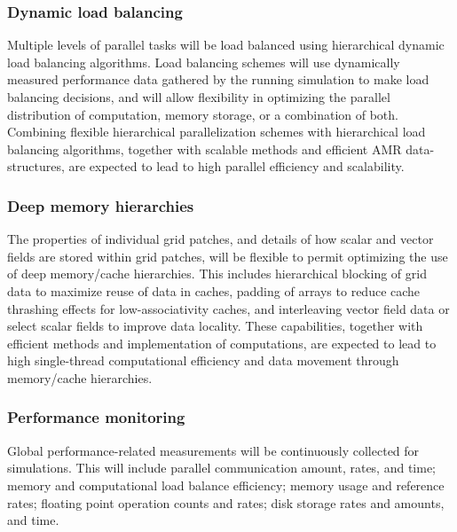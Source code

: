\documentclass{article}
\begin{document}

    \subsubsection{Dynamic load balancing}  

    Multiple levels of parallel tasks will be load balanced using
    hierarchical dynamic load balancing algorithms.  Load balancing
    schemes will use dynamically measured performance data gathered by
    the running simulation to make load balancing decisions, and will
    allow flexibility in optimizing the parallel distribution of
    computation, memory storage, or a combination of both.  Combining
    flexible hierarchical parallelization schemes with hierarchical
    load balancing algorithms, together with scalable methods and
    efficient AMR data-structures, are expected to lead to high
    parallel efficiency and scalability.


    \subsubsection{Deep memory hierarchies}  
%
    The properties of individual grid patches, and details of how
    scalar and vector fields are stored within grid patches, will be
    flexible to permit optimizing the use of deep memory/cache
    hierarchies.  This includes hierarchical blocking of grid data to
    maximize reuse of data in caches, padding of arrays to reduce
    cache thrashing effects for low-associativity caches, and
    interleaving vector field data or select scalar fields to improve
    data locality.  These capabilities, together with efficient
    methods and implementation of computations, are expected to lead
    to high single-thread computational efficiency and data movement
    through memory/cache hierarchies.


    \subsubsection{Performance monitoring}  
%
    Global performance-related measurements will be continuously
    collected for simulations.  This will include parallel
    communication amount, rates, and time; memory and computational
    load balance efficiency; memory usage and reference rates;
    floating point operation counts and rates; disk storage rates and
    amounts, and time.
\end{document}
